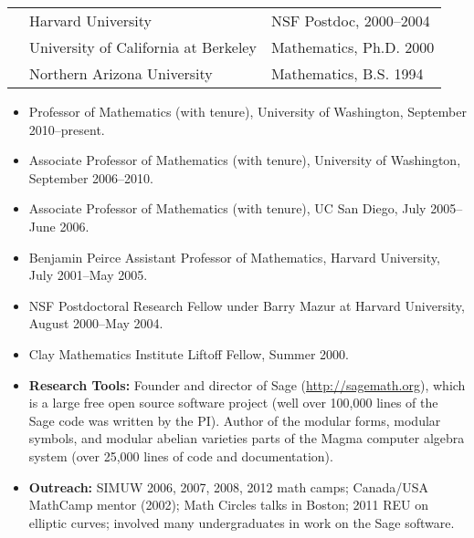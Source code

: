 \documentclass[11pt]{article}
\begin{document}

%
\begin{center}
\begin{tabular}{lll}
\mbox{}\hspace{3.2ex}
&  Harvard University & NSF Postdoc, 2000--2004 \\
&  University of California at Berkeley & Mathematics, Ph.D. 2000 \\
&   Northern Arizona University\hspace{1.03in}\mbox{}& Mathematics, B.S. 1994 \\
\end{tabular}
\end{center}

\begin{itemize}\setlength{\itemsep}{-0.8ex}
\item Professor of Mathematics (with tenure),
University of Washington, September 2010--present.
\item Associate Professor of Mathematics (with tenure),
University of Washington, September 2006--2010.
\item Associate Professor of Mathematics (with tenure),
UC San Diego, July 2005--June 2006.
\item Benjamin Peirce Assistant  Professor  of Mathematics, 
Harvard University, July 2001--May 2005.
\item NSF Postdoctoral Research Fellow 
under Barry Mazur at Harvard University, August 2000--May 2004.
\item Clay Mathematics Institute Liftoff Fellow, Summer 2000.
\end{itemize}

\begin{itemize}\setlength{\itemsep}{-0.5ex}

\item {\bf Research Tools:} Founder and director of Sage
  (\url{http://sagemath.org}), which is a large free open source software
  project (well over 100,000 lines of the Sage code was written by the
  PI).  Author of the modular forms, modular symbols, and modular
  abelian varieties parts of the Magma computer algebra system (over
  25,000 lines of code and documentation).


\item {\bf Outreach:} SIMUW 2006, 2007, 2008, 2012  math
  camps; Canada/USA MathCamp mentor (2002); Math Circles talks in
  Boston; 2011 REU on elliptic curves; involved many
  undergraduates in work on the Sage software.
\end{itemize}
\end{document}
